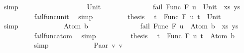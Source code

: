 \begin{isabellebody}
\ simp\isanewline
\ \ \ \ \ \ \isamarkupfalse%
\isanewline
\ \ \ \ \isamarkupfalse%
\isanewline
\ \ \ \ \ \ \isamarkupfalse%
\ Unit\isanewline
\ \ \ \ \ \ %
\isanewline
\ \ \ \ \ \ \isamarkupfalse%
\ {\isachardoublequoteopen}fail\ {\isacharparenleft}{\kern0pt}{\isacharparenleft}{\kern0pt}Func\ F\ u\ {\isasymapprox}{\isacharquery}{\kern0pt}\ Unit{\isacharparenright}{\kern0pt}\ {\isacharhash}{\kern0pt}\ xs{\isacharcomma}{\kern0pt}\ ys{\isacharparenright}{\kern0pt}{\isachardoublequoteclose}\isanewline
\ \ \ \ \ \ \ \ \isamarkupfalse%
\ fail{\isacharunderscore}{\kern0pt}func{\isacharunderscore}{\kern0pt}unit\ \isamarkupfalse%
\ simp\isanewline
\ \ \ \ \ \ \isamarkupfalse%
\ \isamarkupfalse%
\ {\isacharquery}{\kern0pt}thesis\ \isamarkupfalse%
\ {\isacartoucheopen}t{}\ {\isacharequal}{\kern0pt}\ Func\ F\ u{\isacartoucheclose}\ {\isacartoucheopen}t{}\ {\isacharequal}{\kern0pt}\ Unit{\isacartoucheclose}\isanewline
\ \ \ \ \ \ \ \ \isamarkupfalse%
\ simp\isanewline
\ \ \ \ \isamarkupfalse%
\isanewline
\ \ \ \ \ \ \isamarkupfalse%
\ {\isacharparenleft}{\kern0pt}Atom\ b{\isacharparenright}{\kern0pt}\isanewline
\ \ \ \ \ \ %
\isanewline
\ \ \ \ \ \ \isamarkupfalse%
\ {\isachardoublequoteopen}fail\ {\isacharparenleft}{\kern0pt}{\isacharparenleft}{\kern0pt}Func\ F\ u\ {\isasymapprox}{\isacharquery}{\kern0pt}\ Atom\ b{\isacharparenright}{\kern0pt}\ {\isacharhash}{\kern0pt}\ xs{\isacharcomma}{\kern0pt}\ ys{\isacharparenright}{\kern0pt}{\isachardoublequoteclose}\isanewline
\ \ \ \ \ \ \ \ \isamarkupfalse%
\ fail{\isacharunderscore}{\kern0pt}func{\isacharunderscore}{\kern0pt}atom\ \isamarkupfalse%
\ simp\isanewline
\ \ \ \ \ \ \isamarkupfalse%
\ \isamarkupfalse%
\ {\isacharquery}{\kern0pt}thesis\ \isamarkupfalse%
\ {\isacartoucheopen}t{}\ {\isacharequal}{\kern0pt}\ Func\ F\ u{\isacartoucheclose}\ {\isacartoucheopen}t{}\ {\isacharequal}{\kern0pt}\ Atom\ b{\isacartoucheclose}\isanewline
\ \ \ \ \ \ \ \ \isamarkupfalse%
\ simp\isanewline
\ \ \ \ \isamarkupfalse%
\isanewline
\ \ \ \ \ \ \isamarkupfalse%
\ {\isacharparenleft}{\kern0pt}Paar\ v{}\ v{}{\isacharparenright}{\kern0pt}\isanewline

\end{isabellebody}
